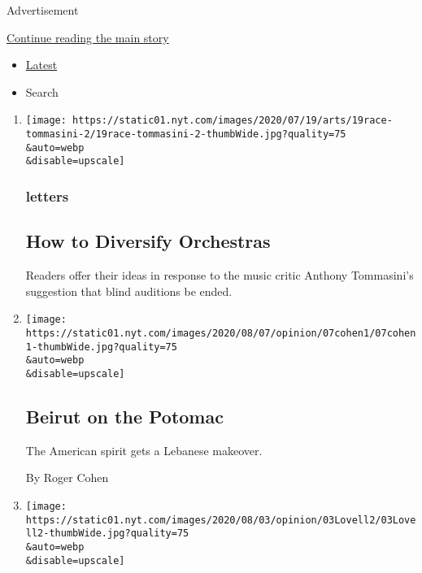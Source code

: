 Advertisement

\protect\hyperlink{after-mid1}{Continue reading the main story}

\begin{itemize}
\tightlist
\item
  \protect\hyperlink{stream-panel}{Latest}
\item
  Search
\end{itemize}

\begin{enumerate}
\def\labelenumi{\arabic{enumi}.}
\item
  \href{/2020/08/08/opinion/letters/orchestras-race-diversity.html}{}

  \texttt{[image: https://static01.nyt.com/images/2020/07/19/arts/19race-tommasini-2/19race-tommasini-2-thumbWide.jpg?quality=75\\\&auto=webp\\\&disable=upscale]}

  \hypertarget{letters}{%
  \subsubsection{letters}\label{letters}}

  \hypertarget{how-to-diversify-orchestras}{%
  \subsection{How to Diversify
  Orchestras}\label{how-to-diversify-orchestras}}

  Readers offer their ideas in response to the music critic Anthony
  Tommasini's suggestion that blind auditions be ended.
\item
  \href{/2020/08/07/opinion/beirut-explosion.html}{}

  \texttt{[image: https://static01.nyt.com/images/2020/08/07/opinion/07cohen1/07cohen1-thumbWide.jpg?quality=75\\\&auto=webp\\\&disable=upscale]}

  \hypertarget{beirut-on-the-potomac}{%
  \subsection{Beirut on the Potomac}\label{beirut-on-the-potomac}}

  The American spirit gets a Lebanese makeover.

  By Roger Cohen
\item
  \href{/2020/08/07/opinion/letters/portland-police.html}{}

  \texttt{[image: https://static01.nyt.com/images/2020/08/03/opinion/03Lovell2/03Lovell2-thumbWide.jpg?quality=75\\\&auto=webp\\\&disable=upscale]}


\end{enumerate}

